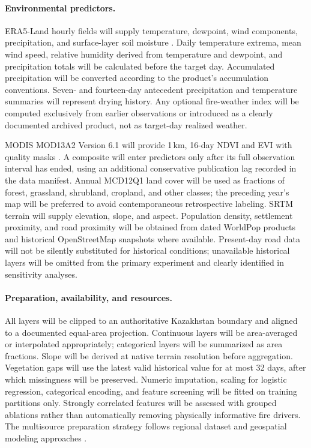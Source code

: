 \documentclass[pdflatex,sn-mathphys-num]{sn-jnl}
\begin{document}
\paragraph{Environmental predictors.}
ERA5-Land hourly fields will supply temperature, dewpoint, wind components, precipitation, and surface-layer soil moisture \cite{munozsabater2021era5land}. Daily temperature extrema, mean wind speed, relative humidity derived from temperature and dewpoint, and precipitation totals will be calculated before the target day. Accumulated precipitation will be converted according to the product's accumulation conventions. Seven- and fourteen-day antecedent precipitation and temperature summaries will represent drying history. Any optional fire-weather index will be computed exclusively from earlier observations or introduced as a clearly documented archived product, not as target-day realized weather.

MODIS MOD13A2 Version 6.1 will provide 1\,km, 16-day NDVI and EVI with quality masks \cite{nasaMod13a2}. A composite will enter predictors only after its full observation interval has ended, using an additional conservative publication lag recorded in the data manifest. Annual MCD12Q1 land cover will be used as fractions of forest, grassland, shrubland, cropland, and other classes; the preceding year's map will be preferred to avoid contemporaneous retrospective labeling. SRTM terrain will supply elevation, slope, and aspect. Population density, settlement proximity, and road proximity will be obtained from dated WorldPop products and historical OpenStreetMap snapshots where available. Present-day road data will not be silently substituted for historical conditions; unavailable historical layers will be omitted from the primary experiment and clearly identified in sensitivity analyses.

\paragraph{Preparation, availability, and resources.}
All layers will be clipped to an authoritative Kazakhstan boundary and aligned to a documented equal-area projection. Continuous layers will be area-averaged or interpolated appropriately; categorical layers will be summarized as area fractions. Slope will be derived at native terrain resolution before aggregation. Vegetation gaps will use the latest valid historical value for at most 32 days, after which missingness will be preserved. Numeric imputation, scaling for logistic regression, categorical encoding, and feature screening will be fitted on training partitions only. Strongly correlated features will be assessed with grouped ablations rather than automatically removing physically informative fire drivers. The multisource preparation strategy follows regional dataset and geospatial modeling approaches \cite{jadouli2024morocco,gupta2024geospatial}.
\end{document}
